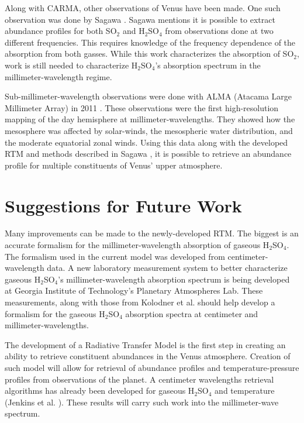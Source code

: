 Along with CARMA, other observations of Venus have been made. One such observation was done by Sagawa \cite{Sagawa-2008}. Sagawa mentions it is possible to extract abundance profiles for both SO$_2$ and H$_2$SO$_4$ from observations done at two different frequencies. This requires knowledge of the frequency dependence of the absorption from both gasses. While this work characterizes the absorption of SO$_2$, work is still needed to characterize H$_2$SO$_4$'s absorption spectrum in the millimeter-wavelength regime. 

Sub-millimeter-wavelength observations were done with ALMA (Atacama Large Millimeter Array) in 2011 \cite{ALMA-2013}. These observations were the first high-resolution mapping of the day hemisphere at millimeter-wavelengths. They showed how the mesosphere was affected by solar-winds, the mesospheric water distribution, and the moderate equatorial zonal winds. Using this data along with the developed RTM and methods described in Sagawa \cite{Sagawa-2008}, it is possible to retrieve an abundance profile for multiple constituents of Venus' upper atmosphere.

\section{Suggestions for Future Work}
Many improvements can be made to the newly-developed RTM. The biggest is an accurate formalism for the millimeter-wavelength absorption of gaseous H$_2$SO$_4$. The formalism used in the current model was developed from centimeter-wavelength data. A new laboratory measurement system to better characterize gaseous H$_2$SO$_4$'s millimeter-wavelength absorption spectrum is being developed at Georgia Institute of Technology's Planetary Atmospheres Lab. These measurements, along with those from Kolodner et al. \cite{Kolodner-1998} should help develop a formalism for the gaseous H$_2$SO$_4$ absorption spectra at centimeter and millimeter-wavelengths. 

The development of a Radiative Transfer Model is the first step in creating an ability to retrieve constituent abundances in the Venus atmosphere. Creation of such model will allow for retrieval of abundance profiles and temperature-pressure profiles from observations of the planet. A centimeter wavelengths retrieval algorithms has already been developed for gaseous H$_2$SO$_4$ and temperature (Jenkins et al. \cite{Jenkins-2002}). These results will carry such work into the millimeter-wave spectrum.